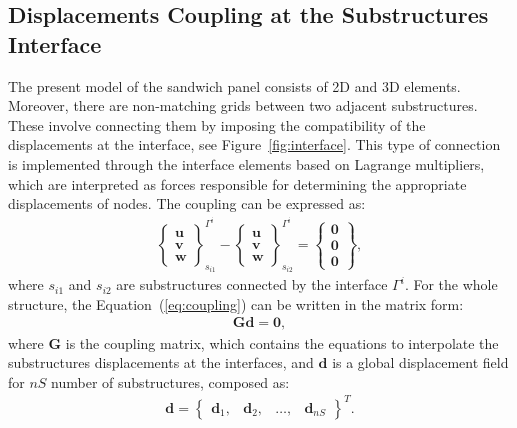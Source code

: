 \documentclass[sensors,article,accept,moreauthors,pdftex]{Definitions/mdpi}
\begin{document}
\subsection{Displacements Coupling at the Substructures Interface}
\label{sec:interface}
The present model of the sandwich panel consists of 2D and 3D elements. 
Moreover, there are non-matching grids between two adjacent substructures. 
These involve connecting them by imposing the compatibility of the displacements at the interface, see Figure~\ref{fig:interface}.
This type of connection is implemented through the interface elements based on Lagrange multipliers, which are interpreted as forces responsible for determining the appropriate displacements of nodes.
The coupling can be expressed as:
\begin{eqnarray}
\left\{\begin{array}{c}
\textbf{u}\\
\textbf{v}\\
\textbf{w}
\end{array}\right\}_{s_{i1}}^{\Gamma^i}-
\left\{\begin{array}{c}
\textbf{u}\\
\textbf{v}\\
\textbf{w}
\end{array}\right\}_{s_{i2}}^{\Gamma^i}=
\left\{\begin{array}{c}
\textbf{0}\\
\textbf{0}\\
\textbf{0}
\end{array}\right\},
\label{eq:coupling}
\end{eqnarray}
where \(s_{i1}\) and \(s_{i2}\) are substructures connected by the interface \(\Gamma^i\). For the whole structure, the Equation~(\ref{eq:coupling}) can be written in the matrix form:
\begin{eqnarray}
\textbf{G}\textbf{d}=\textbf{0},
\label{eq:cond_disp}
\end{eqnarray}
where \textbf{G} is the coupling matrix, which contains the equations to interpolate the substructures displacements at the interfaces, and \(\textbf{d}\) is a global displacement field for \(nS\) number of substructures, composed as:
\begin{eqnarray}
\textbf{d} = \left\{\begin{array}{cccc}
\textbf{d}_1, & \textbf{d}_2, &\ldots, & \textbf{d}_{nS}
\end{array}\right\}^T.
\label{eq:displacements}
\end{eqnarray}
\end{document}
